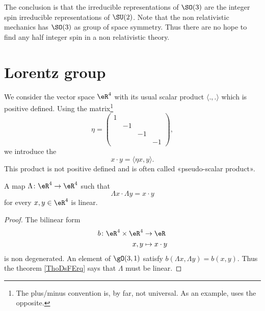 \begin{normaltext}      \label{NORMooHWAYooPlSDOp}
	The conclusion is that the irreducible representations of $\SO(3)$ are the integer spin irreducible representations of $\SU(2)$. Note that the non relativistic mechanics has $\SO(3)$ as group of space symmetry. Thus there are no hope to find any half integer spin in a non relativistic theory.
\end{normaltext}

\section{Lorentz group}

\begin{definition}
	We consider the vector space \( \eR^4\) with its usual scalar product \( \langle ., .\rangle \) which is positive defined. Using the matrix\footnote{The plus/minus convention is, by  far, not universal. As an example, \cite{BIBooYTTJooYpPYLT} uses the opposite.}
	\begin{equation}
		\eta=\begin{pmatrix}
			1 &    &    &    \\
			  & -1 &    &    \\
			  &    & -1 &    \\
			  &    &    & -1
		\end{pmatrix},
	\end{equation}
	we introduce the 
	\begin{equation}    \label{EQooQAXNooXhGUQV}
		x\cdot y=\langle \eta x, y\rangle .
	\end{equation}
	This product is not positive defined and is often called «pseudo-scalar product».
\end{definition}

\begin{lemma}       \label{LEMooICEYooNcjJjD}
	A map \( \Lambda\colon \eR^4\to \eR^4\) such that
	\begin{equation}
		\Lambda x\cdot \Lambda y=x\cdot y
	\end{equation}
	for every \( x,y\in  \eR^4\) is linear.
\end{lemma}

\begin{proof}
	The bilinear form
	\begin{equation}
		\begin{aligned}
			b\colon \eR^4\times \eR^4 & \to \eR          \\
			x,y                       & \mapsto x\cdot y
		\end{aligned}
	\end{equation}
	is non degenerated. An element of \( \gO(3,1)\) satisfy \( b(\Lambda x,\Lambda y)=b(x,y)\). Thus the theorem \ref{ThoDsFErq} says that \( \Lambda\) must be linear.
\end{proof}

